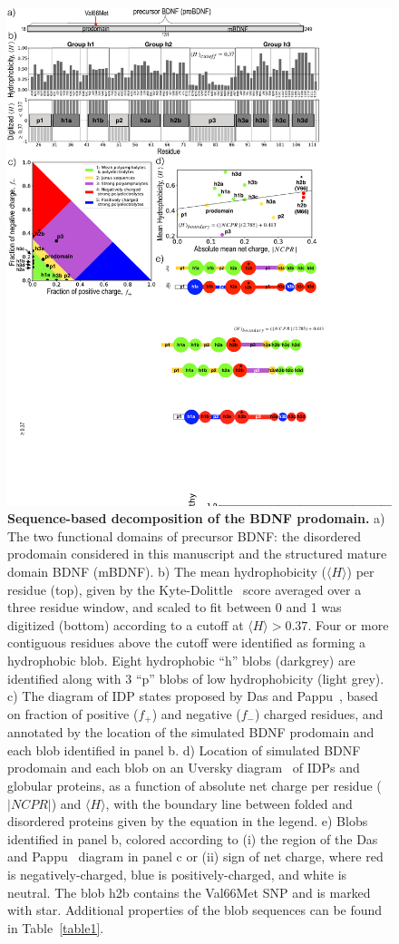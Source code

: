 \documentclass[10pt,letterpaper]{article}
\begin{document}
\begin{figure}[!ht]
\includegraphics[scale=0.5,width=\textwidth,trim={0 0cm 0 0cm},clip]{./figures/fig1.pdf}
\caption{{\bf Sequence-based decomposition of the BDNF prodomain.} a) The two functional domains of precursor BDNF: the disordered prodomain considered in this manuscript and the structured mature domain BDNF (mBDNF). b) The mean hydrophobicity ($\langle H \rangle$) per residue (top), given by the Kyte-Dolittle~\cite{Kyte1982a} score averaged over a three residue window, and scaled to fit between 0 and 1 was digitized (bottom) according to a cutoff at $\langle H \rangle > 0.37$. Four or more contiguous residues above the cutoff were identified as forming a hydrophobic blob. Eight hydrophobic ``h'' blobs (darkgrey) are identified along with 3 ``p'' blobs of low hydrophobicity (light grey). c) The diagram of IDP states proposed by Das and Pappu~\cite{Das2013}, based on fraction of positive ($f_{+}$) and negative ($f_{-}$) charged residues, and annotated by the location of the simulated BDNF prodomain and each blob identified in panel b. d) Location of simulated BDNF prodomain and each blob on an Uversky diagram~\cite{Uversky2000a} of IDPs and globular proteins, as a function of absolute net charge per residue ($|NCPR|$) and $\langle H\rangle$, with the boundary line between folded and disordered proteins given by the equation in the legend. e) Blobs identified in panel b, colored according to (i) the region of the Das and Pappu~\cite{Das2013} diagram in panel c or (ii)  sign of net charge, where red is negatively-charged, blue is positively-charged, and white is neutral. The blob h2b contains the Val66Met SNP and is marked with star. Additional properties of the blob sequences can be found in Table~\ref{table1}.}

\end{figure}
\end{document}

